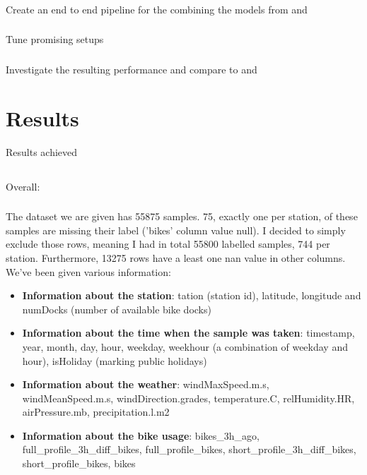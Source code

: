 \documentclass[a4paper]{article}
\begin{document}
    \subsubsection*{} Create an end to end pipeline for the combining the models from  and 
    \subsubsection*{} Tune promising setups
    \subsubsection*{} Investigate the resulting performance and compare to  and 



    \section{Results}\label{sec:results}
    Results achieved

    \subsection*{}
    Overall:

    \subsubsection*{}
    The dataset we are given has 55875 samples. 75, exactly one per station, of these samples are missing their label ('bikes'
    column value null).
    I decided to simply exclude those rows, meaning I had in total 55800 labelled samples, 744 per station. Furthermore,
    13275 rows have a least one nan value in other columns. 
    We've been given various information:
    \begin{itemize}
        \item \textbf{Information about the station}: tation (station id), latitude, longitude and 
        numDocks (number of available bike docks)
        \item \textbf{Information about the time when the sample was taken}: timestamp, year, month, day, hour, 
        weekday, weekhour (a combination of weekday and hour), isHoliday (marking public holidays)
        \item \textbf{Information about the weather}: windMaxSpeed.m.s, windMeanSpeed.m.s,  windDirection.grades, 
        temperature.C, relHumidity.HR, airPressure.mb, precipitation.l.m2
        \item \textbf{Information about the bike usage}: bikes\_3h\_ago, full\_profile\_3h\_diff\_bikes,
          full\_profile\_bikes, short\_profile\_3h\_diff\_bikes, short\_profile\_bikes, bikes
    \end{itemize}
   
\end{document}
